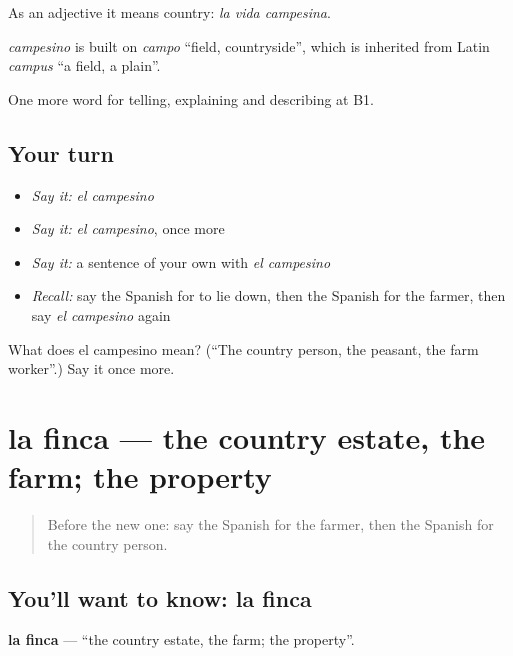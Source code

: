 As an adjective it means country: \emph{la vida campesina}.

\begin{cousinweb}
\emph{campesino} is built on \emph{campo} \textquotedblleft{}field, countryside\textquotedblright{}, which is inherited from Latin \emph{campus} \textquotedblleft{}a field, a plain\textquotedblright{}.
\end{cousinweb}

\begin{grammarlens}[title={What you've built}]
One more word for telling, explaining and describing at B1.
\end{grammarlens}

\subsection*{Your turn}
\begin{itemize}
\raggedright
  \item \emph{Say it:} \emph{el campesino}
  \item \emph{Say it:} \emph{el campesino}, once more
  \item \emph{Say it:} a sentence of your own with \emph{el campesino}
  \item \emph{Recall:} say the Spanish for to lie down, then the Spanish for the farmer, then say \emph{el campesino} again
\end{itemize}

\begin{tcolorbox}[breakable,colback=teal!4,colframe=teal!35!black,title={Before you move on}]
What does el campesino mean? (\textquotedblleft{}The country person, the peasant, the farm worker\textquotedblright{}.) Say it once more.
\end{tcolorbox}
\section[la finca]{la finca — the country estate, the farm; the property}

\label{lesson:ES-C691-finca}



\begin{quote}
Before the new one: say the Spanish for the farmer, then the Spanish for the country person.
\end{quote}

\subsection*{You'll want to know: la finca}
\textbf{la finca} — \textquotedblleft{}the country estate, the farm; the property\textquotedblright{}.

